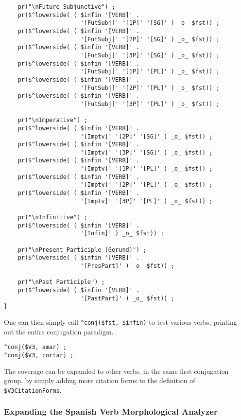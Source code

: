 \begin{Verbatim}
    pr("\nFuture Subjunctive") ;
    pr($^lowerside( ( $infin '[VERB]' . 
                      '[FutSubj]' '[1P]' '[SG]' ) _o_ $fst)) ;
    pr($^lowerside( ( $infin '[VERB]' . 
                      '[FutSubj]' '[2P]' '[SG]' ) _o_ $fst)) ;
    pr($^lowerside( ( $infin '[VERB]' . 
                      '[FutSubj]' '[3P]' '[SG]' ) _o_ $fst)) ;
    pr($^lowerside( ( $infin '[VERB]' . 
                      '[FutSubj]' '[1P]' '[PL]' ) _o_ $fst)) ;
    pr($^lowerside( ( $infin '[VERB]' . 
                      '[FutSubj]' '[2P]' '[PL]' ) _o_ $fst)) ;
    pr($^lowerside( ( $infin '[VERB]' . 
                      '[FutSubj]' '[3P]' '[PL]' ) _o_ $fst)) ;

    pr("\nImperative") ;
    pr($^lowerside( ( $infin '[VERB]' . 
                      '[Imptv]' '[2P]' '[SG]' ) _o_ $fst)) ;
    pr($^lowerside( ( $infin '[VERB]' . 
                      '[Imptv]' '[3P]' '[SG]' ) _o_ $fst)) ;
    pr($^lowerside( ( $infin '[VERB]' . 
                      '[Imptv]' '[1P]' '[PL]' ) _o_ $fst)) ;
    pr($^lowerside( ( $infin '[VERB]' . 
                      '[Imptv]' '[2P]' '[PL]' ) _o_ $fst)) ;
    pr($^lowerside( ( $infin '[VERB]' . 
                      '[Imptv]' '[3P]' '[PL]' ) _o_ $fst)) ;

    pr("\nInfinitive") ;
    pr($^lowerside( ( $infin '[VERB]' . 
                      '[Infin]' ) _o_ $fst)) ;

    pr("\nPresent Participle (Gerund)") ;
    pr($^lowerside( ( $infin '[VERB]' . 
                      '[PresPart]' ) _o_ $fst)) ;

    pr("\nPast Participle") ;
    pr($^lowerside( ( $infin '[VERB]' . 
                      '[PastPart]' ) _o_ $fst)) ;
}
\end{Verbatim}

\noindent
One can then simply call \verb!^conj($fst, $infin)! to test various verbs,
printing out the entire conjugation paradigm.  

\begin{Verbatim}
^conj($V3, amar) ;
^conj($V3, cortar) ;
\end{Verbatim}

\noindent
The coverage can be expanded to other verbs, in the same first-conjugation group,
by simply adding more citation forms to the definition of \verb!$V3CitationForms!.

\subsubsection{Expanding the Spanish Verb Morphological Analyzer}

